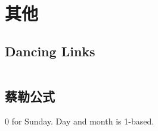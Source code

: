 \chapter{其他}
\section{Dancing Links}
\inputminted{cpp}{\source/others/dancing-links.cpp}
\section{蔡勒公式}
0 for Sunday. Day and month is 1-based.
\inputminted{cpp}{\source/others/zellers-congruence.cpp}
